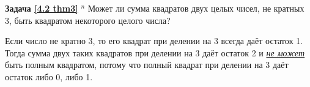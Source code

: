 \textbf{Задача \ref{4.2 thm3}} $^n$
    Может ли сумма квадратов двух целых чисел, не кратных 3, быть квадратом некоторого целого числа?
\begin{prf}
    Если число не кратно 3, то его квадрат при делении на 3 всегда даёт остаток 1. Тогда сумма двух таких квадратов при делении на 3 даёт остаток 2 и \textit{\underline{не может}} быть полным квадратом, потому что полный квадрат при делении на 3 даёт остаток либо 0, либо 1.
\end{prf}
